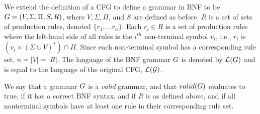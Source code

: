 We extend the definition of a CFG to define a grammar in BNF to be $G = (V, \Sigma, \Pi, S, R)$, where $V, \Sigma, \Pi$, and $S$ are defined as before. $R$ is a set of sets of production rules, denoted $\{r_1, \ldots r_n\}$. Each $r_i \in R$ is a set of production rules where the left-hand side of all rules is the $i^{th}$ non-terminal symbol $v_i$, i.e., $r_i$ is $(v_i \times (\Sigma \cup V)^*) \cap \Pi$. 
Since each non-terminal symbol has a corresponding rule set, $n=|V|=|R|$. The language of the BNF grammar $G$ is denoted by $\mathcal{L}(G)$ and is equal to the language of the original CFG, $\mathcal{L}(\mathcal{G})$.

We say that a grammar $G$ is a \emph{valid} grammar, and that $valid(G)$ evaluates to true, if it has a correct BNF syntax, and if $R$ is as defined above, and if all nonterminal symbols have at least one rule in their corresponding rule set.







